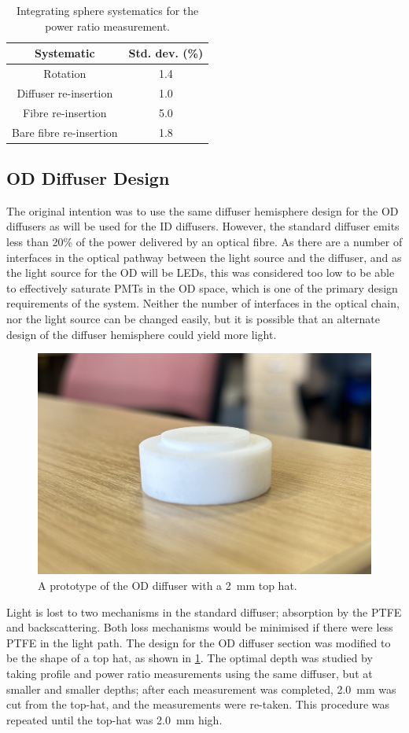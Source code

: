 \documentclass[a4paper,11pt]{article}
\begin{document}
\begin{table}[h!]
\centering
\begin{tabular}{|c|c|}
\hline
Systematic & Std. dev. (\%) \\
\hline
Rotation & 1.4  \\
Diffuser re-insertion & 1.0 \\
Fibre re-insertion & 5.0 \\
Bare fibre re-insertion & 1.8 \\
\hline
\end{tabular}
\caption{Integrating sphere systematics for the power ratio measurement.}
\label{tab:systematics}
\end{table}

\subsection{OD Diffuser Design}

The original intention was to use the same diffuser hemisphere design for the OD diffusers as will be used for the ID diffusers.  However, the standard diffuser emits less than 20\% of the power delivered by an optical fibre. As there are a number of interfaces in the optical pathway between the light source and the diffuser, and as the light source for the OD will be LEDs, this was considered too low to be able to effectively saturate PMTs in the OD space, which is one of the primary design requirements of the system. Neither the number of interfaces in the optical chain, nor the light source can be changed easily, but it is possible that an alternate design of the diffuser hemisphere could yield more light.

\begin{figure}
    \centering    
    \includegraphics[height=.35\textwidth]{2mm_tophat_side.jpg}%
    \caption{A prototype of the OD diffuser with a 2~mm top hat.} 
    \label{fig:topHat}
\end{figure}

Light is lost to two mechanisms in the standard diffuser; absorption by the PTFE and backscattering. Both loss mechanisms would be minimised if there were less PTFE in the light path. The design for the OD diffuser section was modified to be the shape of a top hat, as shown in \cref{fig:topHat}. The optimal depth was studied by taking profile and power ratio measurements using the same diffuser, but at smaller and smaller depths; after each measurement was completed, 2.0~mm was cut from the top-hat, and the measurements were re-taken. This procedure was repeated until the top-hat was 2.0~mm high.
\end{document}
